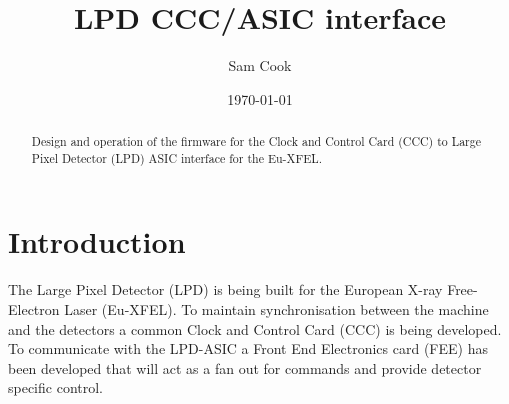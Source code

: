 \documentclass[]{report}
\title{LPD CCC/ASIC interface}
\author{ Sam Cook }
\date{\today}
\begin{document}
    \ifpdf
    \else
    \fi

    \maketitle

    \begin{abstract}
        Design and operation of the firmware for the Clock and Control Card (CCC) to Large Pixel Detector (LPD) ASIC interface for the Eu-XFEL. 
    \end{abstract}
    \tableofcontents
    \chapter{Introduction} %
    \label{cha:introduction}
    The Large Pixel Detector (LPD) is being built for the European X-ray Free-Electron Laser (Eu-XFEL). To maintain synchronisation between the machine and the detectors a common Clock and Control Card (CCC) is being developed. To communicate with the LPD-ASIC a Front End Electronics card (FEE) has been developed that will act as a fan out for commands and provide detector specific control.
    
\end{document}

